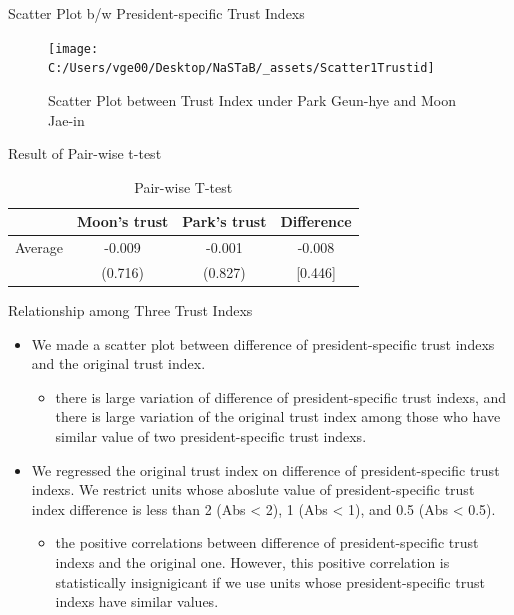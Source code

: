 \documentclass[
  ignorenonframetext,
]{beamer}
\providecommand{\tightlist}{%
  \setlength{\itemsep}{0pt}\setlength{\parskip}{0pt}}
\begin{document}
\begin{frame}{Scatter Plot b/w President-specific Trust Indexs}
\protect\hypertarget{scatter-plot-bw-president-specific-trust-indexs}{}
\begin{figure}
\texttt{[image: C:/Users/vge00/Desktop/NaSTaB/\_assets/Scatter1Trustid]} \caption{Scatter Plot between Trust Index under Park Geun-hye and Moon Jae-in}\label{fig:unnamed-chunk-6}
\end{figure}
\end{frame}

\begin{frame}{Result of Pair-wise t-test}
\protect\hypertarget{result-of-pair-wise-t-test}{}
\begin{table}

\caption{\label{tab:kableTtestPresidentTrustid}Pair-wise T-test}
\centering
\begin{tabular}[t]{lccc}
\toprule
 & Moon's trust & Park's trust & Difference\\
\midrule
Average & -0.009 & -0.001 & -0.008\\
 & (0.716) & (0.827) & [0.446]\\
\bottomrule
\end{tabular}
\end{table}
\end{frame}

\begin{frame}{Relationship among Three Trust Indexs}
\protect\hypertarget{relationship-among-three-trust-indexs}{}
\begin{itemize}
\tightlist
\item
  We made a scatter plot between difference of president-specific trust
  indexs and the original trust index.

  \begin{itemize}
  \tightlist
  \item
    there is large variation of difference of president-specific trust
    indexs, and there is large variation of the original trust index
    among those who have similar value of two president-specific trust
    indexs.
  \end{itemize}
\item
  We regressed the original trust index on difference of
  president-specific trust indexs. We restrict units whose aboslute
  value of president-specific trust index difference is less than 2 (Abs
  \textless{} 2), 1 (Abs \textless{} 1), and 0.5 (Abs \textless{} 0.5).

  \begin{itemize}
  \tightlist
  \item
    the positive correlations between difference of president-specific
    trust indexs and the original one. However, this positive
    correlation is statistically insignigicant if we use units whose
    president-specific trust indexs have similar values.
  \end{itemize}
\end{itemize}
\end{frame}
\end{document}
